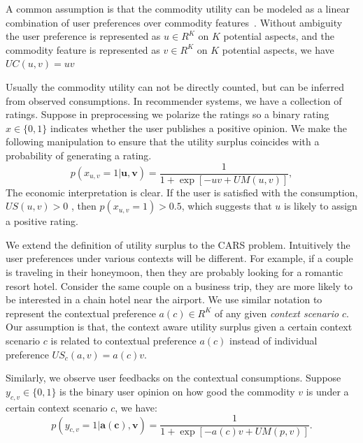 \documentclass{llncs}
\begin{document}
A common assumption is that the commodity utility can be modeled as a linear combination of user preferences over commodity features~\cite{}.  Without ambiguity the user preference is represented as $u \in R^K$ on $K$ potential aspects, and the commodity feature is represented as $v\in R^K$ on $K$ potential aspects, we have $UC(u,v)=uv$

Usually the commodity utility can not be directly counted, but can be inferred from observed consumptions. In recommender systems, we have a collection of ratings. Suppose in preprocessing we polarize the ratings so a binary rating $x\in\{0,1\}$ indicates whether the user publishes a positive opinion. We make the following manipulation to ensure that the utility surplus coincides with a probability of generating a rating.
\begin{equation}\label{equ:utility}
p(x_{u,v}=1|\mathbf{u,v})=\frac{1}{1+\exp{[-uv + UM(u,v)]}}, 
\end{equation}
The economic interpretation is clear. If the user is satisfied with the consumption, $US(u,v)>0$ , then $p(x_{u,v}=1)>0.5$, which suggests that $u$ is likely to assign a positive rating.



We extend the definition of utility surplus to the CARS problem. Intuitively the user preferences under various contexts will be different. For example, if a couple is traveling in their honeymoon, then they are probably looking for a romantic resort hotel.  Consider the same couple on a business trip, they are more likely to be interested  in a chain hotel near the airport. We use similar notation to represent the contextual preference $a(c)\in R^K$ of any given {\em context scenario} $c$. Our assumption is that, the context aware utility surplus given a certain context scenario $c$ is related to contextual preference $a(c)$ instead of individual preference $US_c(a,v)=a(c)v$. 

Similarly, we observe user feedbacks on the contextual consumptions. Suppose $y_{c,v} \in \{0,1\}$ is the binary user opinion on how good the commodity $v$ is under a certain context scenario $c$, we have:
\begin{equation}\label{equ:contextualutility}
p(y_{c,v}=1|\mathbf{a(c),v})=\frac{1}{1+\exp{[-a(c)v+UM(p,v)]}}.
\end{equation}
\end{document}
